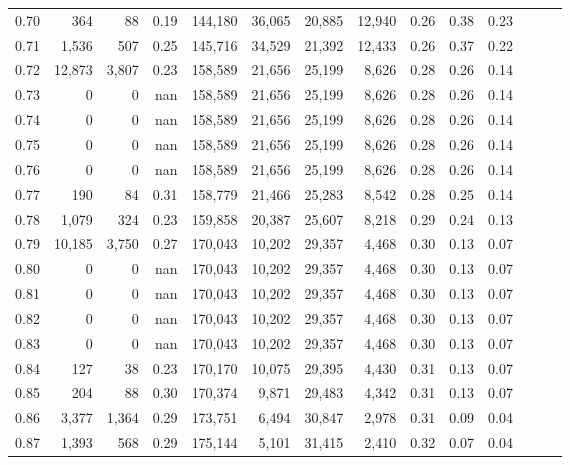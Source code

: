 \begin{tabular}{rrrrrrrrrrrrrr}
0.70 &     364 &     88 &  0.19 &  144,180 &   36,065 &  20,885 &  12,940 &  0.26 &  0.38 &      0.23 \\
0.71 &   1,536 &    507 &  0.25 &  145,716 &   34,529 &  21,392 &  12,433 &  0.26 &  0.37 &      0.22 \\
0.72 &  12,873 &  3,807 &  0.23 &  158,589 &   21,656 &  25,199 &   8,626 &  0.28 &  0.26 &      0.14 \\
0.73 &       0 &      0 &   nan &  158,589 &   21,656 &  25,199 &   8,626 &  0.28 &  0.26 &      0.14 \\
0.74 &       0 &      0 &   nan &  158,589 &   21,656 &  25,199 &   8,626 &  0.28 &  0.26 &      0.14 \\
0.75 &       0 &      0 &   nan &  158,589 &   21,656 &  25,199 &   8,626 &  0.28 &  0.26 &      0.14 \\
0.76 &       0 &      0 &   nan &  158,589 &   21,656 &  25,199 &   8,626 &  0.28 &  0.26 &      0.14 \\
0.77 &     190 &     84 &  0.31 &  158,779 &   21,466 &  25,283 &   8,542 &  0.28 &  0.25 &      0.14 \\
0.78 &   1,079 &    324 &  0.23 &  159,858 &   20,387 &  25,607 &   8,218 &  0.29 &  0.24 &      0.13 \\
0.79 &  10,185 &  3,750 &  0.27 &  170,043 &   10,202 &  29,357 &   4,468 &  0.30 &  0.13 &      0.07 \\
0.80 &       0 &      0 &   nan &  170,043 &   10,202 &  29,357 &   4,468 &  0.30 &  0.13 &      0.07 \\
0.81 &       0 &      0 &   nan &  170,043 &   10,202 &  29,357 &   4,468 &  0.30 &  0.13 &      0.07 \\
0.82 &       0 &      0 &   nan &  170,043 &   10,202 &  29,357 &   4,468 &  0.30 &  0.13 &      0.07 \\
0.83 &       0 &      0 &   nan &  170,043 &   10,202 &  29,357 &   4,468 &  0.30 &  0.13 &      0.07 \\
0.84 &     127 &     38 &  0.23 &  170,170 &   10,075 &  29,395 &   4,430 &  0.31 &  0.13 &      0.07 \\
0.85 &     204 &     88 &  0.30 &  170,374 &    9,871 &  29,483 &   4,342 &  0.31 &  0.13 &      0.07 \\
0.86 &   3,377 &  1,364 &  0.29 &  173,751 &    6,494 &  30,847 &   2,978 &  0.31 &  0.09 &      0.04 \\
0.87 &   1,393 &    568 &  0.29 &  175,144 &    5,101 &  31,415 &   2,410 &  0.32 &  0.07 &      0.04 \\

\end{tabular}
